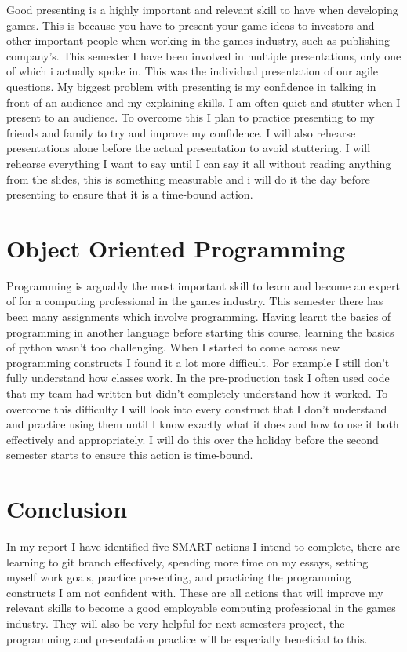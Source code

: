 \documentclass{scrartcl}
\begin{document}
Good presenting is a highly important and relevant skill to have when developing games. This is because you have to present your game ideas to investors and other important people when working in the games industry, such as publishing company's. This semester I have been involved in multiple presentations, only one of which i actually spoke in. This was the individual presentation of our agile questions. My biggest problem with presenting is my confidence in talking in front of an audience and my explaining skills. I am often quiet and stutter when I present to an audience. To overcome this I plan to practice presenting to my friends and family to try and improve my confidence. I will also rehearse presentations alone before the actual presentation to avoid stuttering. I will rehearse everything I want to say until I can say it all without reading anything from the slides, this is something measurable and i will do it the day before presenting to ensure that it is a time-bound action.      

\section{Object Oriented Programming}

Programming is arguably the most important skill to learn and become an expert of for a computing professional in the games industry. This semester there has been many assignments which involve programming. Having learnt the basics of programming in another language before starting this course, learning the basics of python wasn't too challenging. When I started to come across new programming constructs I found it a lot more difficult. For example I still don't fully understand how classes work. In the pre-production task I often used code that my team had written but didn't completely understand how it worked. To overcome this difficulty I will look into every construct that I don't understand and practice using them until I know exactly what it does and how to use it both effectively and appropriately. I will do this over the holiday before the second semester starts to ensure this action is time-bound.    

\section*{Conclusion}

In my report I have identified five SMART actions I intend to complete, there are learning to git branch effectively, spending more time on my essays, setting myself work goals, practice presenting, and practicing the programming constructs I am not confident with. These are all actions that will improve my relevant skills to become a good employable computing professional in the games industry. They will also be very helpful for next semesters project, the programming and presentation practice will be especially beneficial to this.   




\end{document}
